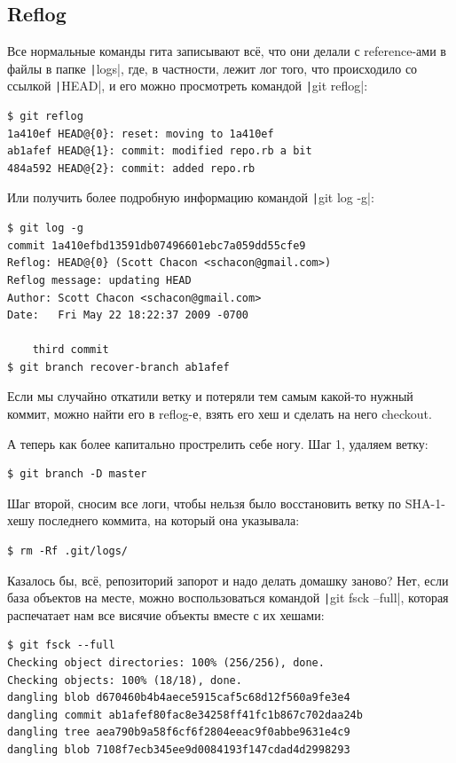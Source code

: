 \documentclass{../../text-style}
\begin{document}
\subsection{Reflog}

Все нормальные команды гита записывают всё, что они делали с reference-ами в файлы в папке \texttt|logs|, где, в частности, лежит лог того, что происходило со ссылкой \texttt|HEAD|, и его можно просмотреть командой \texttt|git reflog|:

\begin{verbatim}
$ git reflog
1a410ef HEAD@{0}: reset: moving to 1a410ef
ab1afef HEAD@{1}: commit: modified repo.rb a bit
484a592 HEAD@{2}: commit: added repo.rb
\end{verbatim}

Или получить более подробную информацию командой \texttt|git log -g|:

\begin{verbatim}
$ git log -g
commit 1a410efbd13591db07496601ebc7a059dd55cfe9
Reflog: HEAD@{0} (Scott Chacon <schacon@gmail.com>)
Reflog message: updating HEAD
Author: Scott Chacon <schacon@gmail.com>
Date:   Fri May 22 18:22:37 2009 -0700

    third commit
$ git branch recover-branch ab1afef
\end{verbatim}

Если мы случайно откатили ветку и потеряли тем самым какой-то нужный коммит, можно найти его в reflog-е, взять его хеш и сделать на него checkout.

А теперь как более капитально прострелить себе ногу. Шаг 1, удаляем ветку:

\begin{verbatim}
$ git branch -D master
\end{verbatim}

Шаг второй, сносим все логи, чтобы нельзя было восстановить ветку по SHA-1-хешу последнего коммита, на который она указывала:

\begin{verbatim}
$ rm -Rf .git/logs/
\end{verbatim}

Казалось бы, всё, репозиторий запорот и надо делать домашку заново? Нет, если база объектов на месте, можно воспользоваться командой \texttt|git fsck --full|, которая распечатает нам все висячие объекты вместе с их хешами:

\begin{verbatim}
$ git fsck --full
Checking object directories: 100% (256/256), done.
Checking objects: 100% (18/18), done.
dangling blob d670460b4b4aece5915caf5c68d12f560a9fe3e4
dangling commit ab1afef80fac8e34258ff41fc1b867c702daa24b
dangling tree aea790b9a58f6cf6f2804eeac9f0abbe9631e4c9
dangling blob 7108f7ecb345ee9d0084193f147cdad4d2998293
\end{verbatim}
\end{document}

